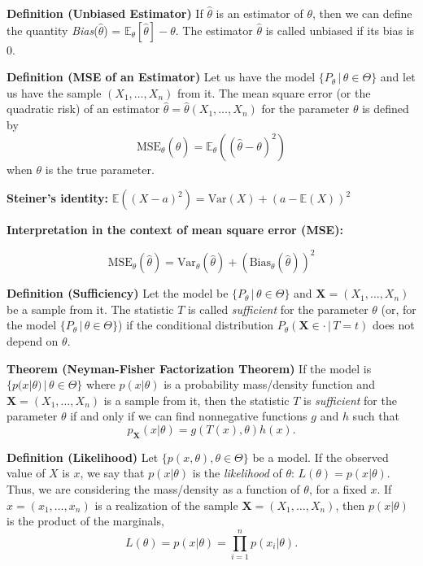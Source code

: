 \documentclass[12pt,a4paper,oneside]{book} %
\begin{document}
\textbf{Definition (Unbiased Estimator)} If $\hat{\theta}$ is an estimator of $\theta$, then we can define the quantity \textit{Bias}($\hat{\theta}$) = $\mathbb{E}_{\theta}[\hat{\theta}] - \theta$. The estimator $\hat{\theta}$ is called unbiased if its bias is 0.

\textbf{Definition (MSE of an Estimator)} Let us have the model $\{P_{\theta} \,|\, \theta \in \Theta\}$ and let us have the sample $(X_1, \ldots, X_n)$ from it. The mean square error (or the quadratic risk) of an estimator $\hat{\theta} = \hat{\theta}(X_1, \ldots, X_n)$ for the parameter $\theta$ is defined by
\[ \text{MSE}_{\theta}(\hat{\theta}) = \mathbb{E}_{\theta}((\hat{\theta} - \theta)^2) \]
when $\theta$ is the true parameter.

\textbf{Steiner's identity:} $\mathbb{E}((X - a)^2) = \text{Var}(X) + (a - \mathbb{E}(X))^2$

\textbf{Interpretation in the context of mean square error (MSE):}

\[ \text{MSE}_{\theta}(\hat{\theta}) = \text{Var}_{\theta}(\hat{\theta}) + (\text{Bias}_{\theta}(\hat{\theta}))^2 \]

\textbf{Definition (Sufficiency)} Let the model be $\{P_{\theta} \,|\, \theta \in \Theta\}$ and $\mathbf{X} = (X_1, \ldots, X_n)$ be a sample from it. The statistic $T$ is called \textit{sufficient} for the parameter $\theta$ (or, for the model $\{P_{\theta} \,|\, \theta \in \Theta\}$) if the conditional distribution $P_{\theta}(\mathbf{X} \in \cdot \,|\, T = t)$ does not depend on $\theta$.

\textbf{Theorem (Neyman-Fisher Factorization Theorem)} If the model is $\{p(x|\theta) \,|\, \theta \in \Theta\}$ where $p(x|\theta)$ is a probability mass/density function and $\mathbf{X} = (X_1, \ldots, X_n)$ is a sample from it, then the statistic $T$ is \textit{sufficient} for the parameter $\theta$ if and only if we can find nonnegative functions $g$ and $h$ such that
\[ p_{\mathbf{X}}(x | \theta) = g(T(x), \theta)h(x). \]

\textbf{Definition (Likelihood)} Let $\{p(x, \theta), \theta \in \Theta\}$ be a model. If the observed value of $X$ is $x$, we say that $p(x | \theta)$ is the \textit{likelihood} of $\theta$: $L(\theta) = p(x | \theta)$. Thus, we are considering the mass/density as a function of $\theta$, for a fixed $x$. If $x = (x_1, \ldots, x_n)$ is a realization of the sample $\mathbf{X} = (X_1, \ldots, X_n)$, then $p(x | \theta)$ is the product of the marginals,
\[ L(\theta) = p(x | \theta) = \prod_{i=1}^{n} p(x_i | \theta). \]
\end{document}

